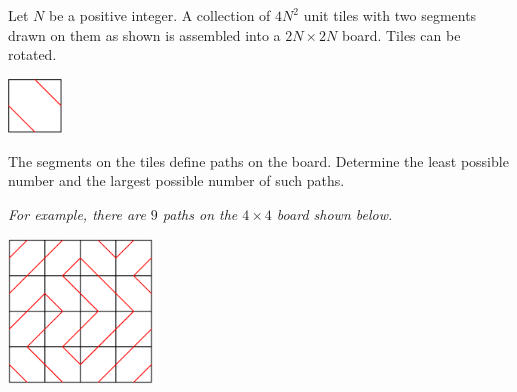 Let $N$ be a positive integer. A collection of $4N^2$ unit tiles with two segments drawn on them as shown is assembled into a $2N\times2N$ board. Tiles can be rotated.
\begin{center}
\includegraphics[width = 14.4mm]{img/fig0.png}
\end{center}
The  segments  on  the  tiles  define  paths  on  the  board. Determine  the  least  possible  number  and  the largest possible number of such paths.

\textit{For example, there are $9$ paths on the $4 \times 4$ board shown below.}
\begin{center}
\includegraphics[width = 38.400000000000006mm]{img/fig1.png}
\end{center}
